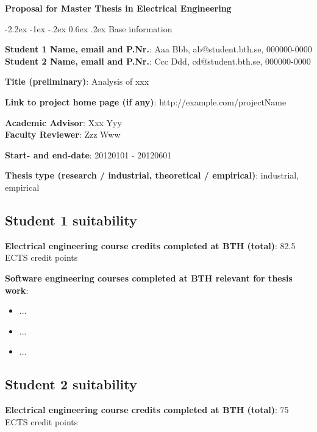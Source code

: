 \documentclass[10pt,english,a4paper]{article}
\makeatletter
\newcommand{\emptyLine}{
	\vspace{16pt}
}
\newcommand{\bthProposalTitle}[1]{
	\noindent\textbf{\Large{#1}}
}
\renewcommand\section{
	\@startsection {section}{1}{\z@}%
		{-2.2ex \@plus -1ex \@minus -.2ex}%
		{0.6ex \@plus.2ex}%
		{\itshape\large\bfseries}
}
\makeatother
\begin{document}


\bthProposalTitle{Proposal for Master Thesis in Electrical Engineering}


\section{Base information}

\noindent
\textbf{Student 1 Name, email and P.Nr.}: Aaa Bbb, ab@student.bth.se, 000000-0000 \\
\textbf{Student 2 Name, email and P.Nr.}: Ccc Ddd, cd@student.bth.se, 000000-0000  
\emptyLine{}

\noindent\textbf{Title (preliminary)}: Analysis of xxx
\emptyLine{}

\noindent\textbf{Link to project home page (if any)}: http://example.com/projectName
\emptyLine{}

\noindent
\textbf{Academic Advisor}: Xxx Yyy \\
\textbf{Faculty Reviewer}:  Zzz Www
\emptyLine{}

\noindent\textbf{Start- and end-date}: 20120101 - 20120601
\emptyLine{}

\noindent\textbf{Thesis type (research / industrial, theoretical / empirical)}: industrial, empirical
\emptyLine{}

\subsection*{Student 1 suitability}
\noindent\textbf{Electrical engineering course credits completed at BTH (total)}: 82.5 ECTS credit points
\emptyLine{}

\noindent\textbf{Software engineering courses completed at BTH relevant for thesis work}:
\begin{itemize}\itemsep=-2pt
\item{...}
\item{...}
\item{...}
\end{itemize}


\subsection*{Student 2 suitability}
\noindent\textbf{Electrical engineering course credits completed at BTH (total)}: 75 ECTS credit points
\emptyLine{}
\end{document}
